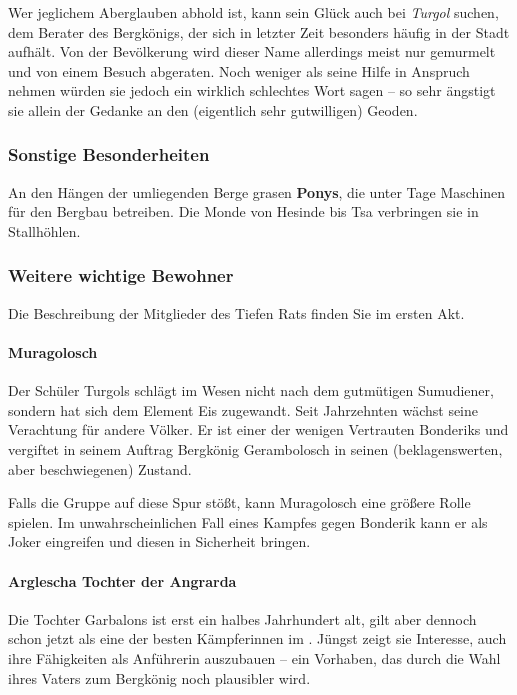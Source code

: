 Wer jeglichem Aberglauben abhold ist, kann sein Glück auch bei \emph{Turgol} suchen, dem Berater des Bergkönigs, der sich in letzter Zeit besonders häufig in der Stadt aufhält.
Von der Bevölkerung wird dieser Name allerdings meist nur gemurmelt und von einem Besuch abgeraten.
Noch weniger als seine Hilfe in Anspruch nehmen würden sie jedoch ein wirklich schlechtes Wort sagen -- so sehr ängstigt sie allein der Gedanke an den (eigentlich sehr gutwilligen) Geoden.

\subsubsection{Sonstige Besonderheiten}
An den Hängen der umliegenden Berge grasen \textbf{Ponys}, die unter Tage Maschinen für den Bergbau betreiben. Die Monde von Hesinde bis Tsa verbringen sie in Stallhöhlen.


\subsubsection{Weitere wichtige Bewohner}

Die Beschreibung der Mitglieder des Tiefen Rats finden Sie im ersten Akt. 

\paragraph{Muragolosch}

Der Schüler Turgols schlägt im Wesen nicht nach dem gutmütigen Sumudiener, sondern hat sich dem Element Eis zugewandt.
Seit Jahrzehnten wächst seine Verachtung für andere Völker.
Er ist einer der wenigen Vertrauten Bonderiks und vergiftet in seinem Auftrag Bergkönig Gerambolosch in seinen (beklagenswerten, aber beschwiegenen) Zustand.

Falls die Gruppe auf diese Spur stößt, kann Muragolosch eine größere Rolle spielen. Im unwahrscheinlichen Fall eines Kampfes gegen Bonderik kann er als Joker eingreifen und diesen in Sicherheit bringen.

\paragraph{Arglescha Tochter der Angrarda}

Die Tochter Garbalons ist erst ein halbes Jahrhundert alt, gilt aber dennoch schon jetzt als eine der besten Kämpferinnen im \fkv.
Jüngst zeigt sie Interesse, auch ihre Fähigkeiten als Anführerin auszubauen -- ein Vorhaben, das durch die Wahl ihres Vaters zum Bergkönig noch plausibler wird.

